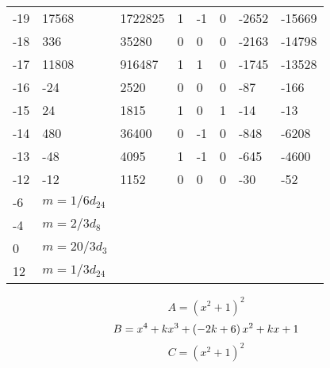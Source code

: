 \documentclass{amsart}
\begin{document}
\begin{longtable}{|l|l|l|lllll|}
-19&17568&1722825&1&-1&0&-2652&-15669\\
-18&336&35280&0&0&0&-2163&-14798\\
-17&11808&916487&1&1&0&-1745&-13528\\
-16&-24&2520&0&0&0&-87&-166\\
-15&24&1815&1&0&1&-14&-13\\
-14&480&36400&0&-1&0&-848&-6208\\
-13&-48&4095&1&-1&0&-645&-4600\\
-12&-12&1152&0&0&0&-30&-52\\
-6&$m=1/6d_{24}$&&\multicolumn{5}{c|}{}\\
-4&$m=2/3d_{8}$&&\multicolumn{5}{c|}{}\\
0&$m=20/3d_{3}$&&\multicolumn{5}{c|}{}\\
12&$m=1/3d_{24}$&&\multicolumn{5}{c|}{}\\
\hline
\end{longtable}
$$A=(x^2
 + 1)^{2}$$
$$B=x^4
 + k\*x^3
 + \left(-2\*k
 + 6\right) \*x^2
 + k\*x
 + 1$$
$$C=(x^2
 + 1)^{2}$$
\end{document}

